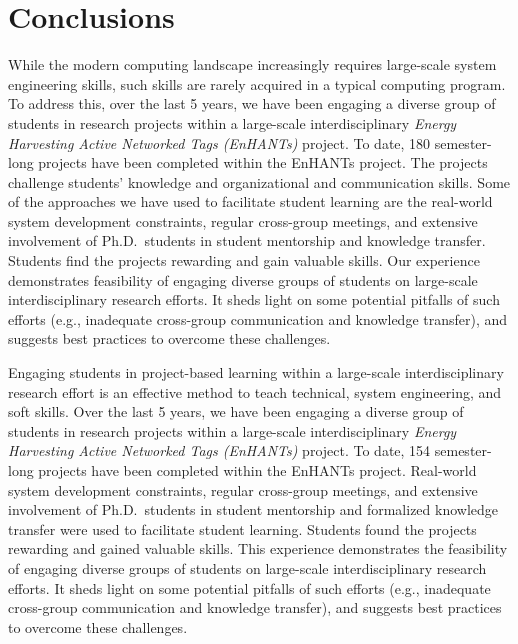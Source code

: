 \documentclass[journal,twopages]{IEEEtran}
\begin{document}
%
 









\section{Conclusions}
\label{sect:Conclusion}




While the modern computing landscape increasingly requires large-scale system engineering skills, such skills are rarely acquired in a typical computing program. To address this, over the last 5 years, we have been engaging a diverse group of students in research projects within a large-scale interdisciplinary \emph{Energy Harvesting Active Networked Tags (EnHANTs)} project.
To date, 180 \mbox{semester-long} projects have been completed within the EnHANTs project. The projects challenge students' knowledge and organizational and communication skills. Some of the approaches we have used to facilitate student learning are the \mbox{real-world} system development constraints, regular cross-group meetings, and extensive involvement of Ph.D.~students in student mentorship and knowledge transfer. Students find the projects rewarding and gain valuable skills. Our experience demonstrates feasibility of engaging diverse groups of students on large-scale interdisciplinary research efforts. It sheds light on some potential pitfalls of such efforts (e.g., inadequate cross-group communication and knowledge transfer), and suggests best practices to overcome these challenges.

\iffalse

Engaging students in project-based learning within a large-scale interdisciplinary research effort is an effective method to teach technical, system engineering, and soft skills.
Over the last 5 years, we have been engaging a diverse group of students in research projects within a large-scale interdisciplinary \emph{Energy Harvesting Active Networked Tags (EnHANTs)} project.
To date, 154 \mbox{semester-long} projects have been completed within the EnHANTs project. \mbox{Real-world} system development constraints, regular cross-group meetings, and extensive involvement of Ph.D.~students in student mentorship and formalized knowledge transfer were used to facilitate student learning. Students found the projects rewarding and gained valuable skills. This experience demonstrates the feasibility of engaging diverse groups of students on large-scale interdisciplinary research efforts. It sheds light on some potential pitfalls of such efforts (e.g., inadequate cross-group communication and knowledge transfer), and suggests best practices to overcome these challenges.
\end{document}
